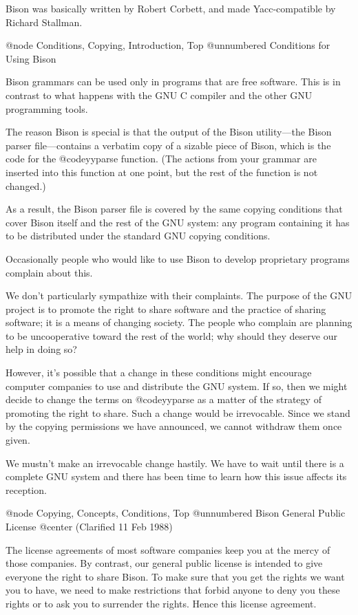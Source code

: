 Bison was basically written by Robert Corbett, and made Yacc-compatible
by Richard Stallman.

@node Conditions, Copying, Introduction, Top
@unnumbered Conditions for Using Bison

Bison grammars can be used only in programs that are free software.  This
is in contrast to what happens with the GNU C compiler and the other
GNU programming tools.

The reason Bison is special is that the output of the Bison utility---the
Bison parser file---contains a verbatim copy of a sizable piece of Bison,
which is the code for the @code{yyparse} function.  (The actions from your
grammar are inserted into this function at one point, but the rest of the
function is not changed.)

As a result, the Bison parser file is covered by the same copying
conditions that cover Bison itself and the rest of the GNU system: any
program containing it has to be distributed under the standard GNU copying
conditions.

Occasionally people who would like to use Bison to develop proprietary
programs complain about this.

We don't particularly sympathize with their complaints.  The purpose of the
GNU project is to promote the right to share software and the practice of
sharing software; it is a means of changing society.  The people who
complain are planning to be uncooperative toward the rest of the world; why
should they deserve our help in doing so?

However, it's possible that a change in these conditions might encourage
computer companies to use and distribute the GNU system.  If so, then we
might decide to change the terms on @code{yyparse} as a matter of the
strategy of promoting the right to share.  Such a change would be
irrevocable.  Since we stand by the copying permissions we have announced,
we cannot withdraw them once given.

We mustn't make an irrevocable change hastily.  We have to wait until there
is a complete GNU system and there has been time to learn how this issue
affects its reception.

@node Copying, Concepts, Conditions, Top
@unnumbered Bison General Public License
@center (Clarified 11 Feb 1988)

The license agreements of most software companies keep you at the
mercy of those companies.  By contrast, our general public license is
intended to give everyone the right to share Bison.  To make sure that
you get the rights we want you to have, we need to make restrictions
that forbid anyone to deny you these rights or to ask you to surrender
the rights.  Hence this license agreement.

